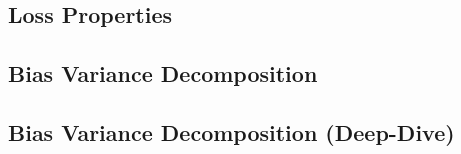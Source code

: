 %

%

\subsection{Loss Properties}


\subsection{Bias Variance Decomposition}


\subsection{Bias Variance Decomposition (Deep-Dive)}

